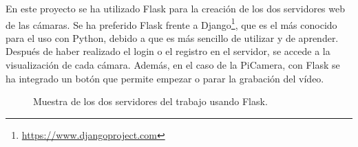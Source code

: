 En este proyecto se ha utilizado Flask para la creación de los dos servidores web de las cámaras. Se ha preferido Flask frente a Django\footnote{\url{https://www.djangoproject.com}}, que es el más conocido para el uso con Python, debido a que es más sencillo de utilizar y de aprender. Después de haber realizado el login o el registro en el servidor, se accede a la visualización de cada cámara. Además, en el caso de la PiCamera, con Flask se ha integrado un botón que permite empezar o parar la grabación del vídeo. \\
\begin{figure}[h!]
  \begin{center}
    \hspace{8mm}
  \end{center}
\caption{Muestra de los dos servidores del trabajo usando Flask.} \label{fig:servers}
\end{figure}

